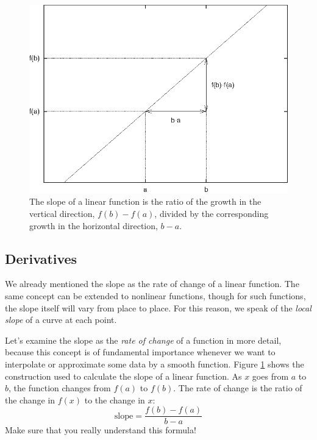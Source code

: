 \begin{figure}
  \centerline{\includegraphics{img/linslope}}
  \caption{The slope of a linear function is the ratio of the growth
    in the vertical direction, $f(b)-f(a)$, divided by the
    corresponding growth in the horizontal direction, $b-a$.}
  \label{fig:linslope}\vspace*{-9pt}
\end{figure}

\subsection{Derivatives}


We already mentioned the slope as the rate of change of a linear
function. The same concept can be extended to nonlinear functions,
though for such functions, the slope itself will vary from place to
place. For this reason, we speak of the \emph{local slope} of a
curve at each point.

Let's examine the slope as the \emph{rate of change} of a function in
more detail, because this concept is of fundamental importance
whenever we want to interpolate or approximate some data by a smooth
function. Figure \ref{fig:linslope} shows the\vadjust{\pagebreak} construction used to
calculate the slope of a linear function. As $x$ goes from $a$ to $b$,
the function changes from $f(a)$ to $f(b)$. The rate of change is the
ratio of the change in $f(x)$ to the change in $x$:
%
\[
\text{slope} = \frac{f(b) - f(a)}{b - a}
\]
%
Make sure that you really understand this formula!



